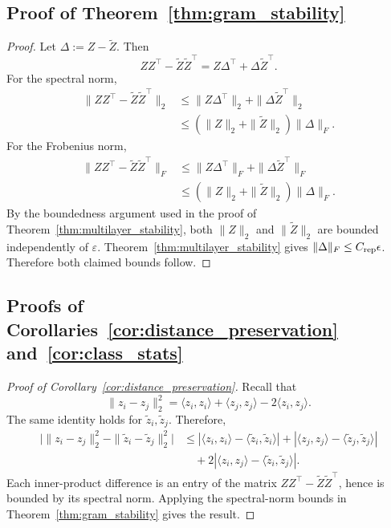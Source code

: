 \documentclass{article}
\begin{document}
\subsection{Proof of Theorem~\ref{thm:gram_stability}}
\label{app:gram_stability}

\begin{proof}
Let $\Delta:=Z-\widetilde Z$. Then
\[
ZZ^\top-\widetilde Z\widetilde Z^\top
=
Z\Delta^\top+\Delta \widetilde Z^\top .
\]
For the spectral norm,
\[
\begin{aligned}
\|ZZ^\top-\widetilde Z\widetilde Z^\top\|_2
&\le
\|Z\Delta^\top\|_2+\|\Delta\widetilde Z^\top\|_2 \\
&\le
(\|Z\|_2+\|\widetilde Z\|_2)\|\Delta\|_F .
\end{aligned}
\]
For the Frobenius norm,
\[
\begin{aligned}
\|ZZ^\top-\widetilde Z\widetilde Z^\top\|_F
&\le
\|Z\Delta^\top\|_F+\|\Delta\widetilde Z^\top\|_F \\
&\le
(\|Z\|_2+\|\widetilde Z\|_2)\|\Delta\|_F .
\end{aligned}
\]
By the boundedness argument used in the proof of Theorem~\ref{thm:multilayer_stability}, both $\|Z\|_2$ and $\|\widetilde Z\|_2$ are bounded independently of $\varepsilon$. Theorem~\ref{thm:multilayer_stability} gives
$\|\Delta\|_F\le C_{\rm rep}\epsilon$. Therefore both claimed bounds follow.

\end{proof}

\subsection{Proofs of Corollaries~\ref{cor:distance_preservation} and~\ref{cor:class_stats}}
\label{app:geometry_corollaries}

\begin{proof}[Proof of Corollary~\ref{cor:distance_preservation}]
Recall that
\[
\|z_i-z_j\|_2^2
=
\langle z_i,z_i\rangle+\langle z_j,z_j\rangle-2\langle z_i,z_j\rangle.
\]
The same identity holds for $\widetilde z_i,\widetilde z_j$. Therefore,
\begin{align*}
\bigl|
\|z_i-z_j\|_2^2-\|\widetilde z_i-\widetilde z_j\|_2^2
\bigr|
&\le
|\langle z_i,z_i\rangle-\langle \widetilde z_i,\widetilde z_i\rangle|
+
|\langle z_j,z_j\rangle-\langle \widetilde z_j,\widetilde z_j\rangle| \\
&\quad +
2|\langle z_i,z_j\rangle-\langle \widetilde z_i,\widetilde z_j\rangle|.
\end{align*}
Each inner-product difference is an entry of the matrix $ZZ^\top-\widetilde Z\widetilde Z^\top$, hence is bounded by its spectral norm. Applying the spectral-norm bounds in Theorem~\ref{thm:gram_stability} gives the result.
\end{proof}
\end{document}
